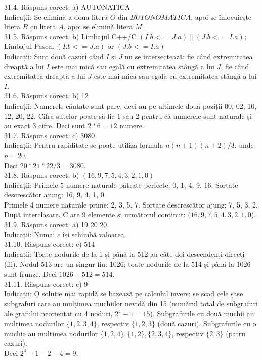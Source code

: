 31.4. Răspuns corect: a) AUTONATICA\\
Indicații: Se elimină a doua literă $O$ din $BUTONOMATICA$, apoi se înlocuiește litera $B$ cu litera $A$, apoi se elimină litera $M$.\\

31.5. Răspuns corect: b) Limbajul C++/C $(I.b<=J.a) \| (J.b<=I.a)$; Limbajul Pascal $(I.b<=J.a)$ or $(J.b<=I.a)$\\
Indicații: Sunt două cazuri când $I$ și $J$ nu se intersectează: fie când extremitatea dreaptă a lui $I$ este mai mică sau egală cu extremitatea stângă a lui $J$, fie când extremitatea dreaptă a lui $J$ este mai mică sau egală cu extremitatea stângă a lui $I$.\\

31.6. Răspuns corect: b) 12\\
Indicații: Numerele căutate sunt pare, deci au pe ultimele două poziții 00, 02, 10, 12, 20, 22. Cifra sutelor poate să fie 1 sau 2 pentru că numerele sunt naturale și au exact 3 cifre. Deci sunt $2*6=12$ numere.\\

31.7. Răspuns corect: c) 3080\\
Indicații: Pentru rapiditate se poate utiliza formula $n(n+1)(n+2) / 3$, unde $n=20$.\\ Deci $20 * 21 * 22 / 3=3080$.\\

31.8. Răspuns corect: b) $(16,9,7,5,4,3,2,1,0)$\\
Indicații: Primele 5 numere naturale pătrate perfecte: 0, 1, 4, 9, 16. Sortate descrescător ajung: 16, 9, 4, 1, 0.\\ Primele 4 numere naturale prime: 2, 3, 5, 7. Sortate descrescător ajung: 7, 5, 3, 2.\\ După interclasare, C are 9 elemente și următorul conținut: $(16,9,7,5,4,3,2,1,0$).\\

31.9. Răspuns corect: a) 19 20 20\\
Indicații: Numai $c$ își schimbă valoarea.\\

31.10. Răspuns corect: c) 514\\
Indicații: Toate nodurile de la 1 și până la 512 au câte doi descendenți direcți (fii). Nodul 513 are un singur fiu: 1026; toate nodurile de la 514 și până la 1026 sunt frunze. Deci $1026-512=514$.\\

31.11. Răspuns corect: c) 9\\
Indicații: O soluție mai rapidă se bazează pe calculul invers: se scad cele șase subgrafuri care au mulțimea muchiilor nevidă din 15 (numărul total de subgrafuri ale grafului neorientat cu 4 noduri, $2^{4}-1=15$). Subgrafurile cu două muchii au mulțimea nodurilor $\{1,2,3,4\}$, respectiv $\{1,2,3\}$ (două cazuri). Subgrafurile cu o muchie au mulțimea nodurilor $\{1,2,4\},\{1,2\},\{2,3,4\}$, respectiv $\{2,3\}$ (patru cazuri).\\ Deci $2^{4}-1-2-4=9$.\\

